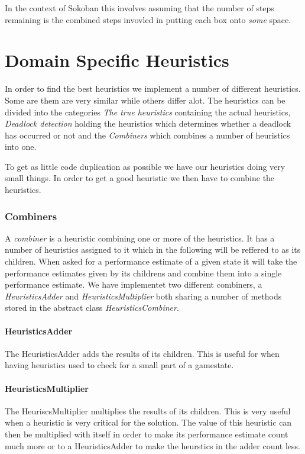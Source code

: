 In the context of Sokoban this involves assuming that the number of
steps remaining is the combined steps invovled in putting each box
onto \emph{some} space.

\section{Domain Specific Heuristics}
In order to find the best heuristics we implement a number of 
different heuristics. Some are them are very similar while others
differ alot. The heuristics can be divided into the categories
\textit{The true heuristics} containing the actual heuristics,
\textit{Deadlock detection} holding the heuristics which determines
whether a deadlock has occurred or not and the \textit{Combiners}
which combines a number of heuristics into one.

To get as little code duplication as possible we have our heuristics
doing very small things. In order to get a good heuristic we then have
to combine the heuristics.

\subsubsection{Combiners}
A \textit{combiner} is a heuristic combining one or more of the
heuristics. It has a number of heuristics assigned to it which in the
following will be reffered to as its children. When asked for a
performance estimate of a given state it will take the performance
estimates given by its childrens and combine them into a single
performance estimate.  We have implementet two different combiners, a
\textit{HeuristicsAdder} and \textit{HeuristicsMultiplier} both
sharing a number of methods stored in the abstract class
\textit{HeuristicsCombiner}.
\paragraph{HeuristicsAdder}The HeuristicsAdder adds the results of its
children. This is useful for when having heuristics used to check for
a small part of a gamestate.
\paragraph{HeuristicsMultiplier}The HeuriscsMultiplier multiplies the
results of its children. This is very useful when a heuristic is very
critical for the solution. The value of this heuristic can then be
multiplied with itself in order to make its performance estimate count
much more or to a HeuristicsAdder to make the heurstics in the adder
count less.

